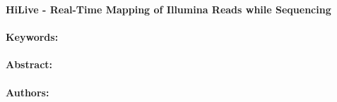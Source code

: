\noindent
\large {\bf HiLive - Real-Time Mapping of Illumina Reads while Sequencing } 


\normalsize 


\noindent \paragraph{Keywords:} 

\noindent \paragraph{Abstract:} 



\noindent \paragraph{Authors:} 

